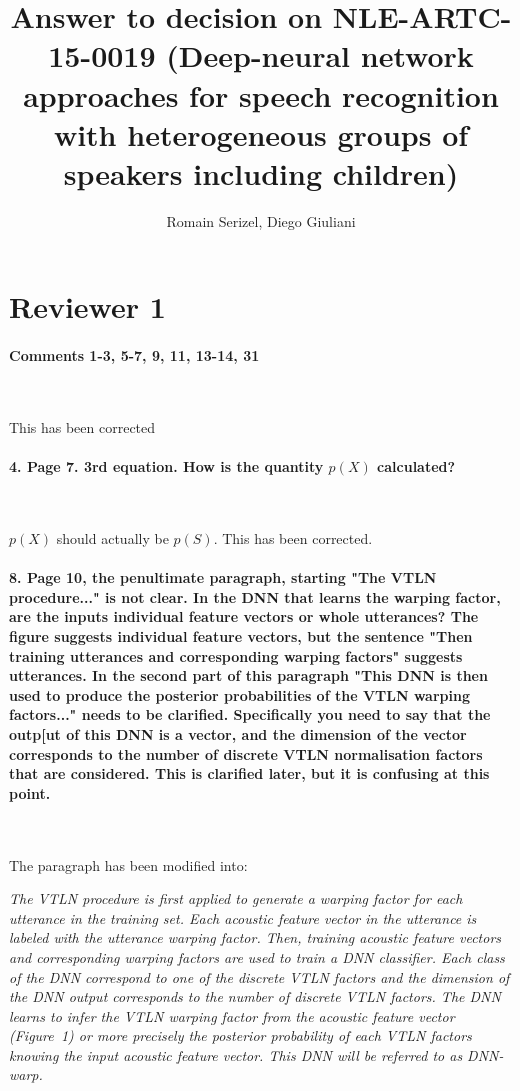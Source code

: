 \documentclass[]{article}
\title{Answer to decision on NLE-ARTC-15-0019 (Deep-neural network approaches for speech recognition with heterogeneous groups of speakers including children)}
\author{Romain Serizel, Diego Giuliani}
\begin{document}
\maketitle


\section{Reviewer 1}
\paragraph{Comments 1-3, 5-7, 9, 11, 13-14, 31}

~

This has been corrected
\paragraph{4. Page 7. 3rd equation. How is the quantity $p(X)$ calculated?}

~

$p(X)$ should actually be $p(S)$. This has been corrected.


\paragraph{8. Page 10, the penultimate paragraph, starting "The VTLN procedure..." is not clear. In the DNN that learns the warping
factor, are the inputs individual feature vectors or whole utterances? The figure suggests individual feature vectors, but the
sentence "Then training utterances and corresponding warping factors" suggests utterances. In the second part of this paragraph "This DNN is then used to produce the posterior probabilities of the VTLN warping factors..." needs to be clarified. Specifically you need to
say that the outp[ut of this DNN is a vector, and the dimension of the vector corresponds to the number of discrete VTLN normalisation
factors that are considered. This is clarified later, but it is confusing at this point.}

~

The paragraph has been modified into:

\textit{The VTLN procedure is first applied to generate a warping factor for each  utterance in the  training set. Each acoustic feature vector in the utterance is labeled with the utterance warping factor. Then, training acoustic feature vectors and corresponding warping factors are used to train a DNN classifier. Each class of the DNN correspond to one of the discrete VTLN factors and the dimension of the DNN output corresponds to the number of discrete VTLN factors. The DNN learns to infer the VTLN warping factor from the acoustic feature vector (Figure~1) or more precisely the posterior probability of each VTLN factors knowing the input acoustic feature vector. This DNN will be referred to as DNN-warp.}
\end{document}
